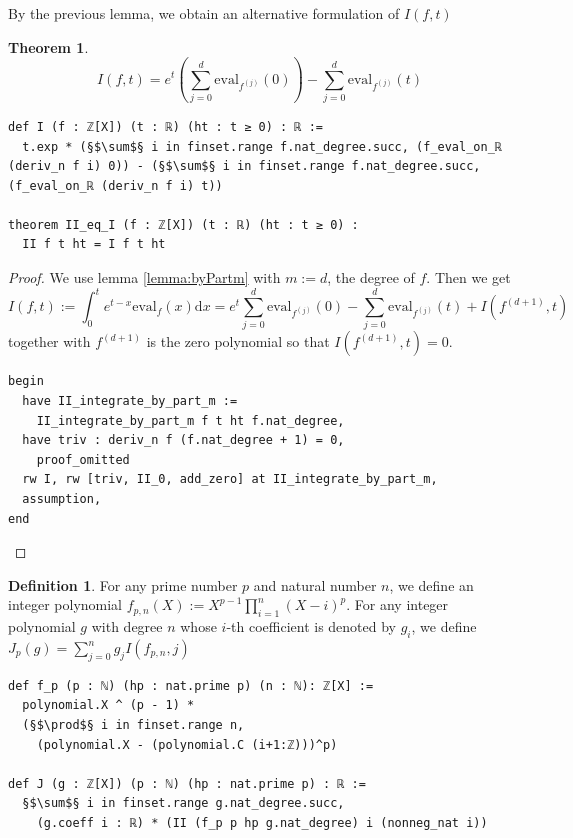 \documentclass{report}
\theoremstyle{definition}
\newtheorem{theorem}{Theorem}[section]
\newtheorem{definition}{Definition}[section]
\begin{document}
By the previous lemma, we obtain an alternative formulation of $I(f, t)$
\begin{theorem}\label{lemma:II_eq_I}
$$
I(f,t)=e^t\left(\sum_{j=0}^d \mathrm{eval}_{f^{(j)}}(0)\right)-\sum_{j=0}^d\mathrm{eval}_{f^{(j)}}(t)
$$

\begin{verbatim}
def I (f : ℤ[X]) (t : ℝ) (ht : t ≥ 0) : ℝ := 
  t.exp * (§$\sum$§ i in finset.range f.nat_degree.succ, (f_eval_on_ℝ (deriv_n f i) 0)) - (§$\sum$§ i in finset.range f.nat_degree.succ, (f_eval_on_ℝ (deriv_n f i) t))

theorem II_eq_I (f : ℤ[X]) (t : ℝ) (ht : t ≥ 0) : 
  II f t ht = I f t ht
\end{verbatim}
\end{theorem}
\begin{proof}
We use lemma \ref{lemma:byPartm} with $m:=d$, the degree of $f$. Then we get
$$
I(f,t):=\int_0^t e^{t-x}\mathrm{eval}_f(x)\mathrm{d}x=e^t\sum_{j=0}^d\mathrm{eval}_{f^{(j)}}(0)-\sum_{j=0}^d\mathrm{eval}_{f^{(j)}}(t)+I(f^{(d+1)}, t)
$$
together with $f^{(d+1)}$ is the zero polynomial so that $I(f^{(d+1)},t)=0$.
\begin{verbatim}
begin
  have II_integrate_by_part_m := 
    II_integrate_by_part_m f t ht f.nat_degree,
  have triv : deriv_n f (f.nat_degree + 1) = 0, 
    proof_omitted
  rw I, rw [triv, II_0, add_zero] at II_integrate_by_part_m,
  assumption,
end
\end{verbatim}
\end{proof}

\begin{definition}
For any prime number $p$ and natural number $n$, we define an integer polynomial $f_{p,n}(X):=X^{p-1}\prod_{i=1}^n(X-i)^p$. For any integer polynomial $g$ with degree $n$ whose $i$-th coefficient is denoted by $g_i$, we define $J_{p}(g)=\sum_{j=0}^ng_j I(f_{p,n}, j)$

\begin{verbatim}
def f_p (p : ℕ) (hp : nat.prime p) (n : ℕ): ℤ[X] := 
  polynomial.X ^ (p - 1) * 
  (§$\prod$§ i in finset.range n, 
    (polynomial.X - (polynomial.C (i+1:ℤ)))^p)

def J (g : ℤ[X]) (p : ℕ) (hp : nat.prime p) : ℝ := 
  §$\sum$§ i in finset.range g.nat_degree.succ, 
    (g.coeff i : ℝ) * (II (f_p p hp g.nat_degree) i (nonneg_nat i))
\end{verbatim}
\end{definition}
\end{document}
